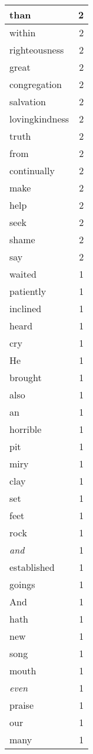 \begin{center}
\begin{longtable}{l|r}
than & 2 \\ \hline
within & 2 \\ \hline
righteousness & 2 \\ \hline
great & 2 \\ \hline
congregation & 2 \\ \hline
salvation & 2 \\ \hline
lovingkindness & 2 \\ \hline
truth & 2 \\ \hline
from & 2 \\ \hline
continually & 2 \\ \hline
make & 2 \\ \hline
help & 2 \\ \hline
seek & 2 \\ \hline
shame & 2 \\ \hline
say & 2 \\ \hline
waited & 1 \\ \hline
patiently & 1 \\ \hline
inclined & 1 \\ \hline
heard & 1 \\ \hline
cry & 1 \\ \hline
He & 1 \\ \hline
brought & 1 \\ \hline
also & 1 \\ \hline
an & 1 \\ \hline
horrible & 1 \\ \hline
pit & 1 \\ \hline
miry & 1 \\ \hline
clay & 1 \\ \hline
set & 1 \\ \hline
feet & 1 \\ \hline
rock & 1 \\ \hline
\emph{and} & 1 \\ \hline
established & 1 \\ \hline
goings & 1 \\ \hline
And & 1 \\ \hline
hath & 1 \\ \hline
new & 1 \\ \hline
song & 1 \\ \hline
mouth & 1 \\ \hline
\emph{even} & 1 \\ \hline
praise & 1 \\ \hline
our & 1 \\ \hline
many & 1 \\ \hline

\end{longtable}
\end{center}
